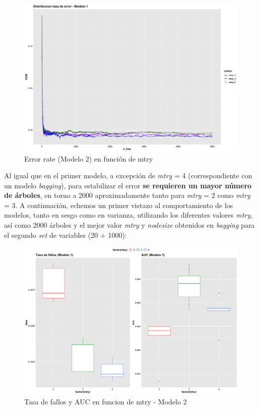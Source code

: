 \documentclass[
]{article}
\begin{document}
\begin{figure}[h!]

{\centering \includegraphics[width=0.99\linewidth,height=0.99\textheight,]{./charts/random_forest/error_rates/error_rate_2} 

}

\caption{Error rate (Modelo 2) en función de mtry}\label{fig:unnamed-chunk-88}
\end{figure}

Al igual que en el primer modelo, a excepción de \emph{mtry} = 4
(correspondiente con un modelo \emph{bagging}), para estabilizar el
error \textbf{se requieren un mayor número de árboles}, en torno a 2000
aproximadamente tanto para \emph{mtry} = 2 como \emph{mtry} = 3. A
continuación, echemos un primer vistazo al comportamiento de los
modelos, tanto en sesgo como en varianza, utilizando los diferentes
valores \emph{mtry}, así como 2000 árboles y el mejor valor \emph{mtry}
y \emph{nodesize} obtenidos en \emph{bagging} para el segundo \emph{set}
de variables (20 + 1000):

\begin{figure}[h!]

{\centering \includegraphics[width=0.99\linewidth,height=0.99\textheight,]{./charts/random_forest/04_comp_inicial_mtry_modelo2} 

}

\caption{Tasa de fallos y AUC en funcion de mtry - Modelo 2}\label{fig:unnamed-chunk-89}
\end{figure}
\end{document}
